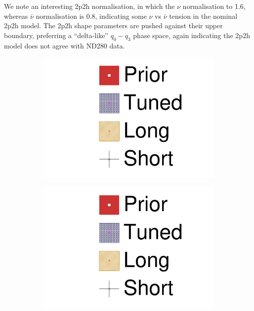 We note an interesting 2p2h normalisation, in which the $\nu$ normalisation to 1.6, whereas $\bar{\nu}$ normalisation is 0.8, indicating some $\nu$ vs $\bar{\nu}$ tension in the nominal 2p2h model. The 2p2h shape parameters are pushed against their upper boundary, preferring a ``delta-like'' $q_0-q_3$ phase space, again indicating the 2p2h model does not agree with ND280 data.
\begin{figure}[h]
	\begin{subfigure}[t]{0.49\textwidth}
		\includegraphics[width=\textwidth, trim={0mm 0mm 0mm 0mm}, clip,page=18]{figures/mach3/data/2017b_NewData_NewDet_UpdXsecStep_2Xsec_4Det_5Flux_0_2017b_June_NewDet_merge_2017b_NewDet_June_Long_0}
	\end{subfigure}
	\begin{subfigure}[t]{0.49\textwidth}
		\includegraphics[width=\textwidth, trim={0mm 0mm 0mm 0mm}, clip,page=19]{figures/mach3/data/2017b_NewData_NewDet_UpdXsecStep_2Xsec_4Det_5Flux_0_2017b_June_NewDet_merge_2017b_NewDet_June_Long_0}
	\end{subfigure}
	

\end{figure}
